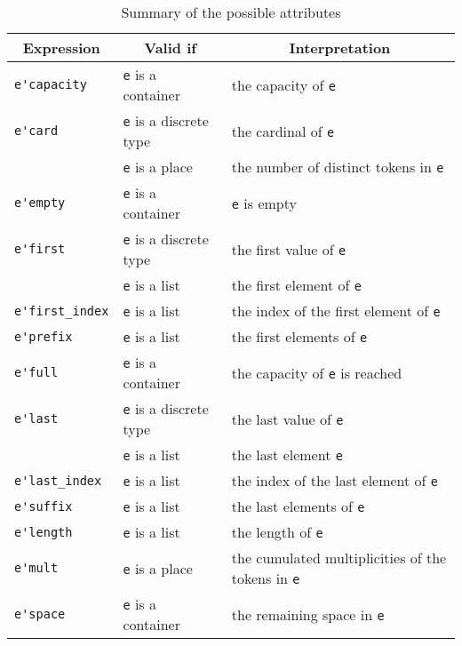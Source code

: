 \begin{table}
  \caption{Summary of the possible attributes}
  \label{table_attributes}
  \begin{center}
    \begin{tabular}{|l|l|l|}
      \hline
      \multicolumn{1}{|c|}{Expression} &
      \multicolumn{1}{|c|}{Valid if} &
      \multicolumn{1}{|c|}{Interpretation}\\
      \hline
      \lstinline{e'capacity} &
      \lstinline{e} is a container &
      the capacity of \lstinline{e}\\
      \hline
      \lstinline{e'card} &
      \lstinline{e} is a discrete type &
      the cardinal of \lstinline{e}\\
      &
      \lstinline{e} is a place &
      the number of distinct tokens in \lstinline{e}\\
      \hline
      \lstinline{e'empty} &
      \lstinline{e} is a container &
      \lstinline{e} is empty\\
      \hline
      \lstinline{e'first} &
      \lstinline{e} is a discrete type &
      the first value of \lstinline{e}\\
      &
      \lstinline{e} is a list &
      the first element of \lstinline{e}\\
      \hline
      \lstinline{e'first_index} &
      \lstinline{e} is a list &
      the index of the first element of \lstinline{e}\\
      \hline
      \lstinline{e'prefix} &
      \lstinline{e} is a list &
      the first elements of \lstinline{e}\\
      \hline
      \lstinline{e'full} &
      \lstinline{e} is a container &
      the capacity of \lstinline{e} is reached\\
      \hline
      \lstinline{e'last} &
      \lstinline{e} is a discrete type &
      the last value of \lstinline{e}\\
      &
      \lstinline{e} is a list &
      the last element \lstinline{e}\\
      \hline
      \lstinline{e'last_index} &
      \lstinline{e} is a list &
      the index of the last element of \lstinline{e}\\
      \hline
      \lstinline{e'suffix} &
      \lstinline{e} is a list &
      the last elements of \lstinline{e}\\
      \hline
      \lstinline{e'length} &
      \lstinline{e} is a list &
      the length of \lstinline{e}\\
      \hline
      \lstinline{e'mult} &
      \lstinline{e} is a place &
      the cumulated multiplicities of the tokens in \lstinline{e}\\
      \hline
      \lstinline{e'space} &
      \lstinline{e} is a container &
      the remaining space in \lstinline{e}\\
      \hline
    \end{tabular}
  \end{center}
\end{table}

